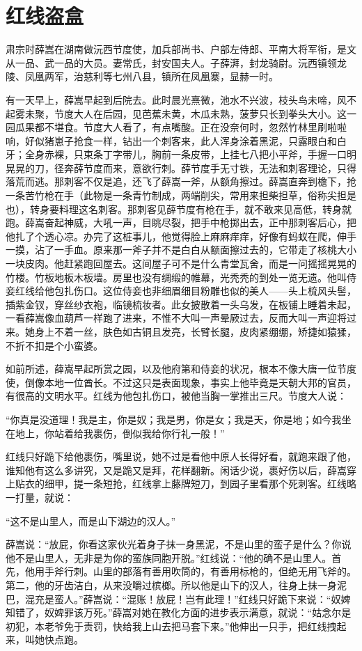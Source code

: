 \chapter{红线盗盒}

肃宗时薛嵩在湖南做沅西节度使，加兵部尚书、户部左侍郎、平南大将军衔，是文从一品、武一品的大员。妻常氏，封安国夫人。子薛湃，封龙骑尉。沅西镇领龙陵、凤凰两军，治慈利等七州八县，镇所在凤凰寨，显赫一时。 

有一天早上，薛嵩早起到后院去。此时晨光熹微，池水不兴波，枝头鸟未啼，风不起雾未聚，节度大人在后园，见芭蕉未黄，木瓜未熟，菠萝只长到拳头大小。这一园瓜果都不堪食。节度大人看了，有点嘴酸。正在没奈何时，忽然竹林里刷啦啦响，好似猪崽子抢食一样，钻出一个刺客来，此人浑身涂着黑泥，只露眼白和白牙；全身赤裸，只束条丁字带儿，胸前一条皮带，上挂七八把小平斧，手握一口明晃晃的刀，径奔薛节度而来，意欲行刺。薛节度手无寸铁，无法和刺客理论，只得落荒而逃。那刺客不仅是追，还飞了薛嵩一斧，从额角擦过。薛嵩直奔到檐下，抢一条苦竹枪在手（此物是一条青竹制成，两端削尖，常用来担柴担草，俗称尖担是也），转身要料理这名刺客。那刺客见薛节度有枪在手，就不敢来见高低，转身就跑。薛嵩奋起神威，大吼一声，目眺尽裂，把手中枪掷出去，正中那刺客后心，把他扎了个透心凉。办完了这桩事儿，他觉得脸上麻麻痒痒，好像有蚂蚁在爬，伸手一摸，沾了一手血。原来那一斧子并不是白白从额面擦过去的，它带走了核桃大小一块皮肉。他赶紧跑回屋去。这间屋子可不是什么青堂瓦舍，而是一问摇摇晃晃的竹楼。竹板地板木板墙。房里也没有绸缎的帷幕，光秃秃的到处一览无遗。他叫侍妾红线给他包扎伤口。这位侍妾也非细眉细目粉雕也似的美人——头上梳风头髻，插紫金钗，穿丝纱衣袍，临镜梳妆者。此女披散着一头乌发，在板铺上睡着未起，一看薛嵩像血葫芦一样跑了进来，不惟不大叫一声晕厥过去，反而大叫一声迎将过来。她身上不着一丝，肤色如古铜且发亮，长臂长腿，皮肉紧绷绷，矫捷如猿猱，不折不扣是个小蛮婆。 

如前所述，薛嵩早起所赏之园，以及他府第和侍妾的状况，根本不像大唐一位节度使，倒像本地一位酋长。不过这只是表面现象，事实上他毕竟是天朝大邦的官员，有很高的文明水平。红线为他包扎伤口，被他当胸一掌推出三尺。节度大人说： 

“你真是没道理！我是主，你是奴；我是男，你是女；我是天，你是地；如今我坐在地上，你站着给我裹伤，倒似我给你行礼一般！” 

红线只好跪下给他裹伤，嘴里说，她不过是看他中原人长得好看，就跑来跟了他，谁知他有这么多讲究，又是跪又是拜，花样翻新。闲话少说，裹好伤以后，薛嵩穿上贴衣的细甲，提一条短抢，红线拿上藤牌短刀，到园子里看那个死刺客。红线略一打量，就说： 

“这不是山里人，而是山下湖边的汉人。” 

薛嵩说：“放屁，你看这家伙光着身子抹一身黑泥，不是山里的蛮子是什么？你说他不是山里人，无非是为你的蛮族同胞开脱。”红线说：“他的确不是山里人。首先，他用手斧行刺。山里的部落有善用吹筒的，有善用标枪的，但绝无用飞斧的。第二，他的牙齿洁白，从来没嚼过槟榔。所以他是山下的汉人，往身上抹一身泥巴，混充是蛮人。”薛嵩说：“混账！放屁！岂有此理！”红线只好跪下来说：“奴婢知错了，奴婢罪该万死。”薛嵩对她在教化方面的进步表示满意，就说：“姑念尔是初犯，本老爷免于责罚，快给我上山去把马套下来。”他伸出一只手，把红线拽起来，叫她快点跑。 

